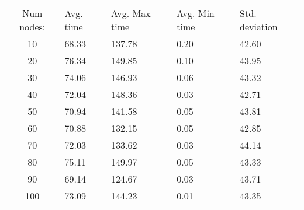 \begin{tabular}{cllll}
Num nodes: & Avg. time & Avg. Max time & Avg. Min time & Std. deviation \\
10       & 68.33        & 137.78            & 0.20 & 42.60 \\
20       & 76.34        & 149.85            & 0.10 & 43.95 \\
30       & 74.06        & 146.93            & 0.06 & 43.32 \\
40       & 72.04        & 148.36            & 0.03 & 42.71 \\
50       & 70.94        & 141.58            & 0.05 & 43.81 \\
60       & 70.88        & 132.15            & 0.05 & 42.85 \\
70       & 72.03        & 133.62            & 0.03 & 44.14 \\
80       & 75.11        & 149.97            & 0.05 & 43.33 \\
90       & 69.14        & 124.67            & 0.03 & 43.71 \\
100       & 73.09        & 144.23            & 0.01 & 43.35 \\
\end{tabular}
